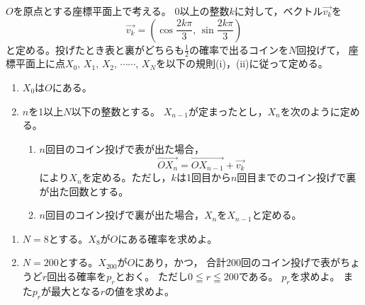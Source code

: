 \documentclass[../../main.tex]{subfiles}
\begin{document}
$O$を原点とする座標平面上で考える。
0以上の整数$k$に対して，ベクトル$\overrightarrow{v_k}$を
\[ \overrightarrow{v_k}=
\left( \cos\frac{2k\pi}{3}, \, \sin\frac{2k\pi}{3} \right) \]
と定める。投げたとき表と裏がどちらも$\displaystyle\frac{1}{2}$の確率で出るコインを$N$回投げて，
座標平面上に点$X_0, \, X_1, \, X_2, \, \cdots\cdots, \, X_N$を以下の規則(i)，(ii)に従って定める。
\begin{enumerate}
  \item$X_0$は$O$にある。
  \item$n$を1以上$N$以下の整数とする。
    $X_{n-1}$が定まったとし，$X_n$を次のように定める。
    \begin{enumerate}
      \item[●]$n$回目のコイン投げで表が出た場合，
        \[ \overrightarrow{OX_n}=\overrightarrow{OX_{n-1}}+\overrightarrow{v_k} \]
        により$X_n$を定める。ただし，$k$は1回目から$n$回目までのコイン投げで裏が出た回数とする。
      \item[●]$n$回目のコイン投げで裏が出た場合，$X_n$を$X_{n-1}$と定める。
    \end{enumerate}
\end{enumerate}
\begin{enumerate}
  \item$N=8$とする。$X_8$が$O$にある確率を求めよ。
  \item$N=200$とする。$X_{200}$が$O$にあり，かつ，
    合計200回のコイン投げで表がちょうど$r$回出る確率を$p_r$とおく。
    ただし$0 \leqq r \leqq 200$である。
    $p_r$を求めよ。
    また$p_r$が最大となる$r$の値を求めよ。
\end{enumerate}
\end{document}
